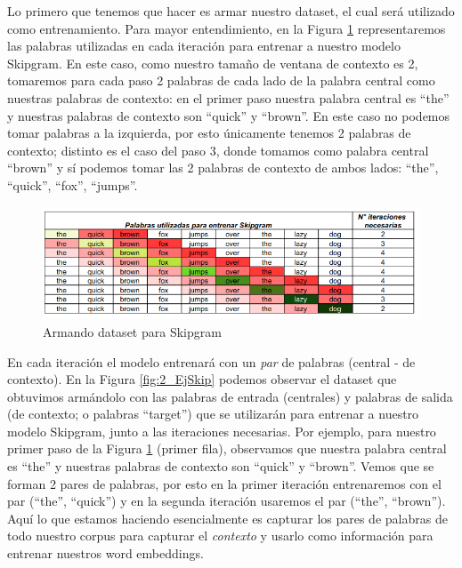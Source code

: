 \documentclass[12pt,a4paper]{article}
\begin{document}
\begin{sloppypar}
Lo primero que tenemos que hacer es armar nuestro dataset, el cual será utilizado como entrenamiento. Para mayor entendimiento, en la Figura \ref{fig:1_EjSkip} representaremos las palabras utilizadas en cada iteración para entrenar a nuestro modelo Skipgram. En este caso, como nuestro tamaño de ventana de contexto es 2, tomaremos para cada paso 2 palabras de cada lado de la palabra central como nuestras palabras de contexto: en el primer paso nuestra palabra central es “the” y nuestras palabras de contexto son “quick” y “brown”. En este caso no podemos tomar palabras a la izquierda, por esto únicamente tenemos 2 palabras de contexto; distinto es el caso del paso 3, donde tomamos como palabra central “brown” y sí podemos tomar las 2 palabras de contexto de ambos lados: “the”, “quick”, “fox”, “jumps”. 

\begin{figure}[H]    %
\centering
\includegraphics[width=1\textwidth]{images/Ejemplo_Skipgram/1_EjSkip.png}
\caption{Armando dataset para Skipgram} 
\label{fig:1_EjSkip}
\end{figure}

En cada iteración el modelo entrenará con un \textit{par} de palabras (central - de contexto). En la Figura \ref{fig:2_EjSkip} podemos observar el dataset que obtuvimos armándolo con las palabras de entrada (centrales) y palabras de salida (de contexto; o palabras “target”) que se utilizarán para entrenar a nuestro modelo Skipgram, junto a las iteraciones necesarias. Por ejemplo, para nuestro primer paso de la Figura \ref{fig:1_EjSkip} (primer fila), observamos que nuestra palabra central es “the” y nuestras palabras de contexto son “quick” y “brown”. Vemos que se forman 2 pares de palabras, por esto en la primer iteración entrenaremos con el par (“the”, “quick”) y en la segunda iteración usaremos el par (“the”, “brown”). Aquí lo que estamos haciendo esencialmente es capturar los pares de palabras de todo nuestro corpus para capturar el \textit{contexto} y usarlo como información para entrenar nuestros word embeddings. 


\end{sloppypar}
\end{document}
